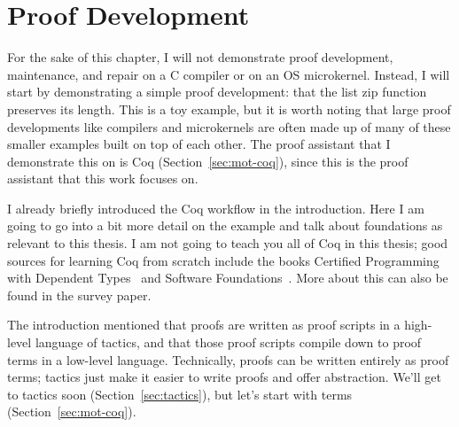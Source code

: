 \section{Proof Development}
\label{sec:mot-dev}


For the sake of this chapter, I will not demonstrate proof development, maintenance, and repair on a C compiler or on an OS microkernel.
Instead, I will start by demonstrating a simple proof development: 
that the list zip function preserves its length.
This is a toy example, but it is worth noting that large proof developments like compilers and microkernels
are often made up of many of these smaller examples built on top of each other.	
The proof assistant that I demonstrate this on is Coq (Section~\ref{sec:mot-coq}), since this is the proof assistant that this work focuses on.

I already briefly introduced the Coq workflow in the introduction.
Here I am going to go into a bit more detail on the example and talk about foundations as relevant to this thesis.
I am not going to teach you all of Coq in this thesis;
good sources for learning Coq from scratch include the books Certified Programming with Dependent Types~\cite{chlipala:cpdt}
and Software Foundations~\cite{software-foundations}.
More about this can also be found in the survey paper.

The introduction mentioned that proofs are written as proof scripts in a high-level language of tactics,
and that those proof scripts compile down to proof terms in a low-level language.
Technically, proofs can be written entirely as proof terms; tactics just make it easier to write proofs and offer abstraction.
We'll get to tactics soon (Section~\ref{sec:tactics}), but let's start with terms (Section~\ref{sec:mot-coq}).





